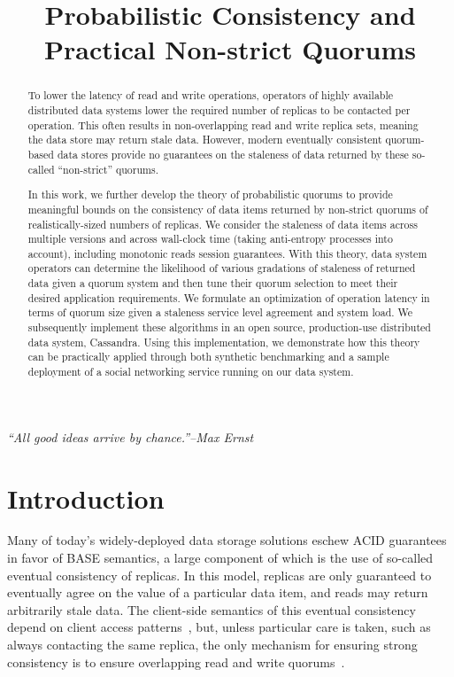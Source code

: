 \documentclass{vldb}
\title{Probabilistic Consistency and Practical Non-strict Quorums}
\begin{document}
\maketitle

\noindent\textit{``All good ideas arrive by chance.''--Max Ernst}

\begin{abstract}


To lower the latency of read and write operations, operators of highly
available distributed data systems lower the required number of replicas
to be contacted per operation. This often results in non-overlapping
read and write replica sets, meaning the data store may return stale
data. However, modern eventually consistent quorum-based data stores
provide no guarantees on the staleness of data returned by these
so-called “non-strict” quorums.

In this work, we further develop the theory of probabilistic quorums
to provide meaningful bounds on the consistency of data items returned
by non-strict quorums of realistically-sized numbers of replicas. We
consider the staleness of data items across multiple versions and
across wall-clock time (taking anti-entropy processes into account),
including monotonic reads session guarantees. With this theory,
data system operators can determine the likelihood of various gradations
of staleness of returned data given a quorum system and then tune
their quorum selection to meet their desired application requirements.
We formulate an optimization of operation latency in terms of quorum
size given a staleness service level agreement and system load. We
subsequently implement these algorithms in an open source,
production-use distributed data system, Cassandra. Using this
implementation, we demonstrate how this theory can be practically
applied through both synthetic benchmarking and a sample deployment of
a social networking service running on our data system.

\end{abstract}

\section{Introduction}


Many of today's widely-deployed data storage solutions eschew ACID
guarantees in favor of BASE semantics, a large component of which is
the use of so-called eventual consistency of replicas.  In this model,
replicas are only guaranteed to eventually agree on the value of a
particular data item, and reads may return arbitrarily stale data.
The client-side semantics of this eventual consistency depend on
client access patterns~\cite{vogels-defs}, but, unless particular care
is taken, such as always contacting the same replica, the only
mechanism for ensuring strong consistency is to ensure overlapping
read and write quorums~\cite{dynamo}.
\end{document}
